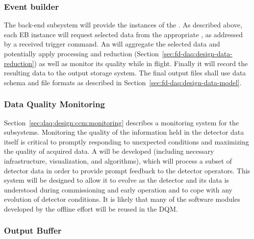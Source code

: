 \subsubsection{Event builder}
\label{sec:fd-daq:design-event-builder}

The  back-end subsystem will provide the instances of the .
As described above, each EB instance will request selected data from
the appropriate , as addressed by a received trigger command. 
An  will aggregate the selected data and potentially apply processing and reduction (Section~\ref{sec:fd-daq:design-data-reduction}) as well as monitor its quality while in flight.
Finally it will record the resulting data to the output storage system.
The final output files shall use data schema and file formats as described in Section~\ref{sec:fd-daq:design-data-model}.



\subsubsection{Data Quality Monitoring}
\label{sec:fd-daq:design-data-quality}

Section~\ref{sec:daq:design:ccm:monitoring} describes a monitoring system for the  subsystems. 
Monitoring the quality of the information held in the detector data itself is critical to promptly responding to unexpected conditions and maximizing the quality of acquired data. 
A   
will be developed (including necessary infrastructure, visualization,
and algorithms), which will process a subset of detector data in order
to provide prompt feedback to the detector operators. 
This system will be designed to allow it to evolve as the detector and its data is understood during commissioning and early operation and to cope with any evolution of detector conditions.
It is likely that many of the software modules developed by the
offline effort will be reused in the DQM.

\subsubsection{Output Buffer}


